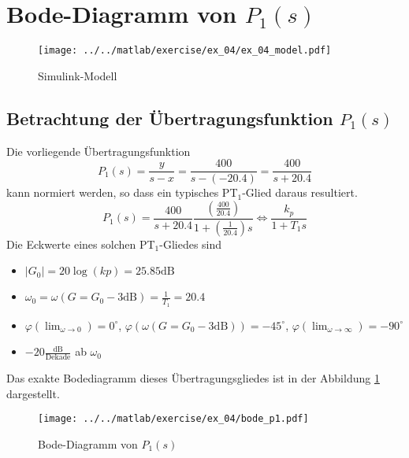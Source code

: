 \section{Bode-Diagramm von $P_1(s)$}
\begin{figure}[h!]
	\centering
	\texttt{[image: ../../matlab/exercise/ex\_04/ex\_04\_model.pdf]}
	\caption{Simulink-Modell}
\end{figure}

\subsection{Betrachtung der Übertragungsfunktion $P_1(s)$}
Die vorliegende Übertragungsfunktion 
\[
	P_1(s) = \frac{y}{s-x} = \frac{400}{s - (-20.4)} = \frac{400}{s + 20.4}
\]
kann normiert werden, so dass ein typisches PT$_1$-Glied daraus resultiert.
\[
	P_1(s) = \frac{400}{s + 20.4}
		\frac{\left(\frac{400}{20.4}\right)}{1 + \left(\frac{1}{20.4}\right)s}
		\Leftrightarrow \frac{k_p}{1 + T_1 s}
\]
Die Eckwerte eines solchen PT$_1$-Gliedes sind
\begin{itemize}
	\item $|G_0| = 20 \log (kp) = 25.85\mathrm{dB}$
	\item $\omega_0 = \omega(G = G_0 - 3\mathrm{dB}) = \frac{1}{T_1} = 20.4$
	\item $\varphi(\lim_{\omega \rightarrow 0}) = 0^{\circ}$, 
		$\varphi({\omega(G = G_0 - 3\mathrm{dB})}) = -45^{\circ}$,
		$\varphi(\lim_{\omega \rightarrow \infty}) = -90^{\circ}$
	\item $-20\frac{\mathrm{dB}}{\mathrm{Dekade}}$ ab $\omega_0$
\end{itemize}
Das exakte Bodediagramm dieses Übertragungsgliedes ist in der Abbildung
\ref{fig:bode_p1} dargestellt.
\begin{figure}[h!]
	\centering
	\texttt{[image: ../../matlab/exercise/ex\_04/bode\_p1.pdf]}
	\caption{Bode-Diagramm von $P_1(s)$}
	\label{fig:bode_p1}
\end{figure}
